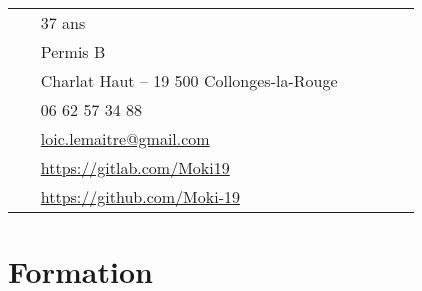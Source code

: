 \documentclass[10pt]{article} %
\begin{document}
\begin{paracol}{2}
  \switchcolumn%


  \parbox[top][0.12\textheight][c]{\linewidth}{ %
    \vspace{-0.04\textheight} %
    \colorbox{shade}{ %
      \begin{supertabular}{p{0.05\linewidth}|p{0.775\linewidth}} %
        \raisebox{0pt}{\faMale} & 37 ans \\ %
        \raisebox{-1pt}{\small\faCar} & Permis B \\ %
        \raisebox{-1pt}{\faHome} & Charlat Haut -- 19 500 Collonges-la-Rouge \\ %
        \raisebox{-1pt}{\faPhone} & 06 62 57 34 88 \\ %
        \raisebox{0pt}{\small\faEnvelope} & \href{mailto:loic.lemaitre@gmail.com}{loic.lemaitre@gmail.com} \\ %
        \raisebox{-1pt}{\small\faGitlab} & \href{https://gitlab.com/Moki19}{https://gitlab.com/Moki19} \\ %
        \raisebox{-1pt}{\small\faGithub} & \href{https://github.com/Moki-19}{https://github.com/Moki-19} \\ %
      \end{supertabular}
    }
  }


  \section{Formation}




\end{paracol}
\end{document}
